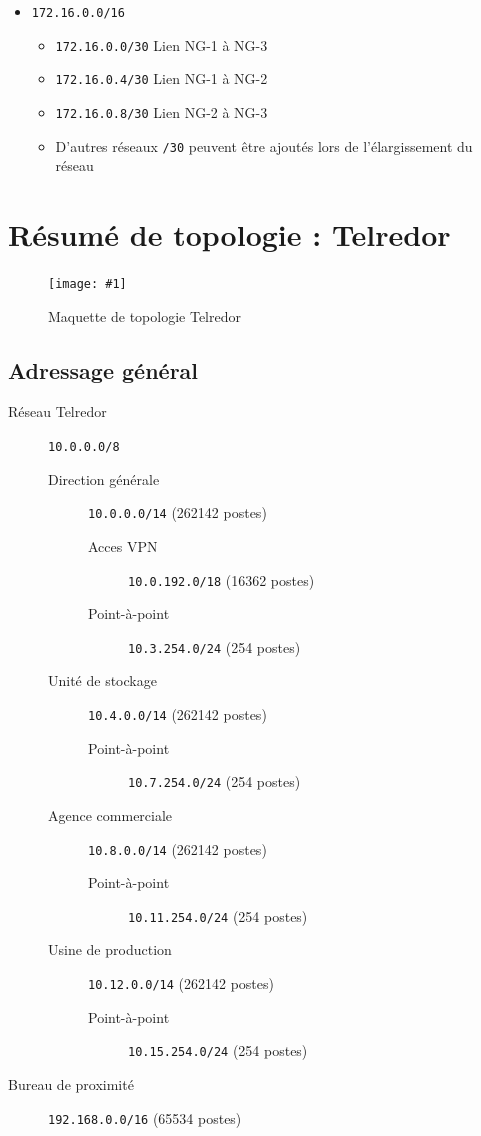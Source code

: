 \documentclass{article}
\newenvironment{figue}[1]{
	\par
	\bigskip
	\begin{figure}[h]
	\begin{center}
	  \texttt{[image: \#1]}
	\end{center}
}{
	\end{figure}
	\bigskip
}
\newcommand{\tlr}{Telredor\xspace}
\begin{document}
\begin{itemize}
	\item \texttt{172.16.0.0/16}
	\begin{itemize}
		\item \texttt{172.16.0.0/30} Lien NG-1 à NG-3
		\item \texttt{172.16.0.4/30} Lien NG-1 à NG-2
		\item \texttt{172.16.0.8/30} Lien NG-2 à NG-3
		\item D'autres réseaux \texttt{/30} peuvent être ajoutés lors de l'élargissement du réseau
	\end{itemize}
\end{itemize}



\section{Résumé de topologie : \tlr}

\begin{figue}{img/telredor.pdf}
	\caption{Maquette de topologie \tlr}
\end{figue}

\subsection{Adressage général}

\begin{description}
	\item[Réseau \tlr] \texttt{10.0.0.0/8}
	\begin{description}
		\item[Direction générale] \texttt{10.0.0.0/14} (262142 postes)
		\begin{description}
			\item[Acces VPN] \texttt{10.0.192.0/18} (16362 postes)
			\item[Point-à-point] \texttt{10.3.254.0/24} (254 postes)
		\end{description}
		\item[Unité de stockage] \texttt{10.4.0.0/14} (262142 postes)
		\begin{description}
			\item[Point-à-point] \texttt{10.7.254.0/24} (254 postes)
		\end{description}
		\item[Agence commerciale] \texttt{10.8.0.0/14} (262142 postes)
		\begin{description}
			\item[Point-à-point] \texttt{10.11.254.0/24} (254 postes)
		\end{description}
		\item[Usine de production] \texttt{10.12.0.0/14} (262142 postes)
		\begin{description}
			\item[Point-à-point] \texttt{10.15.254.0/24} (254 postes)
		\end{description}
	\end{description}
	\item[Bureau de proximité] \texttt{192.168.0.0/16} (65534 postes)
\end{description}
\end{document}

